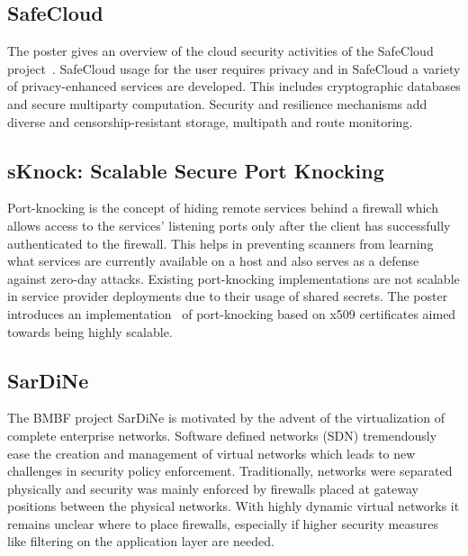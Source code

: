
\subsection{SafeCloud}

The poster gives an overview of the cloud security activities of the SafeCloud
project~\cite{safecloud}. SafeCloud usage for the user requires privacy and in
SafeCloud a variety of privacy-enhanced services are developed. This includes
cryptographic databases and secure multiparty computation.  Security and
resilience mechanisms add diverse and censorship-resistant storage, multipath
and route monitoring.


\subsection{sKnock: Scalable Secure Port Knocking}

Port-knocking  is  the  concept  of  hiding  remote  services behind   a
firewall   which   allows   access   to   the   services’ listening ports only
after the client has successfully authenticated to  the firewall.  This  helps
in  preventing  scanners  from  learning what services  are  currently
available  on  a  host  and  also  serves as a  defense  against  zero-day
attacks.  Existing  port-knocking implementations are not scalable in service
provider deployments due to their usage of shared secrets. The poster
introduces an  implementation~\cite{dsel:mcsp:2016} of port-knocking  based
on x509 certificates aimed towards  being highly  scalable.


\subsection{SarDiNe}

The BMBF project SarDiNe is motivated by the advent of the virtualization of
complete enterprise networks. Software defined networks (SDN) tremendously
ease the creation and management of virtual networks which leads to new
challenges in security policy enforcement. Traditionally, networks were
separated physically and security was mainly enforced by firewalls placed at
gateway positions between the physical networks. With highly dynamic virtual
networks it remains unclear where to place firewalls, especially if higher
security measures like filtering on the application layer are needed.

